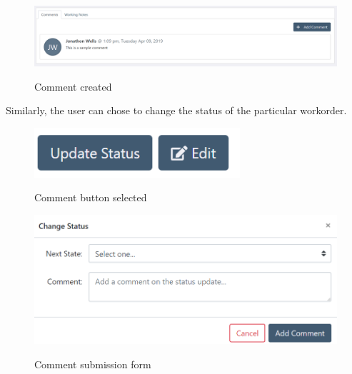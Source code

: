{{\begin{figure}[H]
	\centering
	\includegraphics[width=5in]{comment.png}\\
	\caption{Comment created}
	\label{fig:tobias}
\end{figure}

Similarly, the user can chose to change the status of the particular workorder. 
\begin{figure}[H]
	\centering
	\includegraphics[width=3in]{Change-Status-button.png}\\
	\caption{Comment button selected}
	\label{fig:tobias}
\end{figure}

\begin{figure}[H]
	\centering
	\includegraphics[width=5in]{add-change-status.png}\\
	\caption{Comment submission form}
	\label{fig:tobias}
\end{figure}

\newpage
}}
